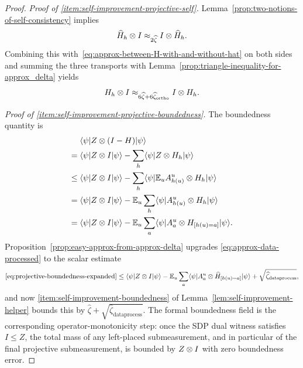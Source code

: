 \begin{proof}
  \emph{Proof of \ref{item:self-improvement-projective-self}.}
  Lemma~\ref{prop:two-notions-of-self-consistency} implies
  \[
    \widehat{H}_h \otimes I \approx_{2\widehat{\zeta}} I \otimes \widehat{H}_h.
  \]
  Combining this with~\eqref{eq:approx-between-H-with-and-without-hat} on both sides and summing the three transports with Lemma~\ref{prop:triangle-inequality-for-approx_delta} yields
  \[
    H_h \otimes I \approx_{6 \widehat{\zeta} + 6\widehat{\zeta}_{\mathrm{ortho}}} I \otimes H_h.
  \]

  \emph{Proof of \ref{item:self-improvement-projective-boundedness}.}
  The boundedness quantity is
  \begin{align}
    &\langle \psi \rvert Z \otimes (I - H) \lvert \psi \rangle \notag\\
    ={}& \langle \psi \rvert Z \otimes I \lvert \psi \rangle - \sum_h \langle \psi \rvert Z \otimes H_h \lvert \psi \rangle \notag\\
    \leq{}& \langle \psi \rvert Z \otimes I \lvert \psi \rangle - \sum_h \langle \psi \rvert \mathbb{E}_{u} A^{u}_{h(u)} \otimes H_h \lvert \psi \rangle \notag\\
    ={}& \langle \psi \rvert Z \otimes I \lvert \psi \rangle -\mathbb{E}_{u} \sum_h \langle \psi \rvert  A^{u}_{h(u)} \otimes H_h \lvert \psi \rangle \notag\\
    ={}& \langle \psi \rvert Z \otimes I \lvert \psi \rangle -\mathbb{E}_{u} \sum_a \langle \psi \rvert  A^{u}_{a} \otimes H_{[h(u)=a]} \lvert \psi \rangle. \label{eq:projective-boundedness-expanded}
  \end{align}
  Proposition~\ref{prop:easy-approx-from-approx-delta} upgrades
  \eqref{eq:approx-data-processed} to the scalar estimate
  \[
    \eqref{eq:projective-boundedness-expanded}
    \le \langle \psi \rvert Z \otimes I \lvert \psi \rangle -\mathbb{E}_{u} \sum_a \langle \psi \rvert  A^{u}_{a} \otimes \widehat H_{[h(u)=a]} \lvert \psi \rangle + \sqrt{\widehat{\zeta}_{\mathrm{dataprocess}}},
  \]
  and now \ref{item:self-improvement-boundedness} of Lemma~\ref{lem:self-improvement-helper} bounds this by $\widehat{\zeta} + \sqrt{\widehat{\zeta}_{\mathrm{dataprocess}}}$.
  The formal boundedness field
  is the corresponding operator-monotonicity step: once the SDP dual witness
  satisfies $I\le Z$, the total mass of any left-placed submeasurement, and in
  particular of the final projective submeasurement, is bounded by $Z\otimes I$ with
  zero boundedness error.


\end{proof}
